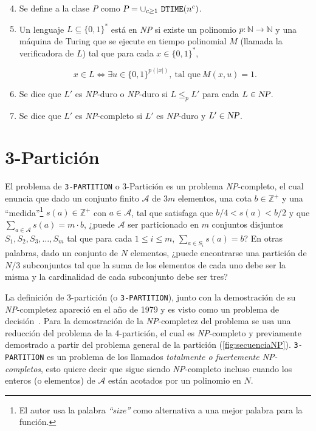 \begin{enumerate}
  \setcounter{enumi}{3}

\item Se define a la clase \textsl{P} como
  $\textsl{P} = \cup_{c \geq 1} ~ \texttt{DTIME}(n^{c})$.

\item Un lenguaje $L \subseteq \{0, 1\}^{*}$ está en \textsl{NP} si existe un
  polinomio $p: \mathbb{N} \longrightarrow \mathbb{N}$ y una máquina de Turing
  que se ejecute en tiempo polinomial $M$ (llamada la verificadora de $L$) tal
  que para cada $x \in \{0,1\}^{*}$,

  \begin{displaymath}
    x \in L \Leftrightarrow \exists u \in \{0,1\}^{p(|x|)},~
    \textrm{tal que} ~ M(x,u) = 1.
  \end{displaymath}

\item Se dice que $L'$ es \textsl{NP}-duro o \textsl{NP}-duro si
  $L \leq_{p} L'$ para cada $L \in \textsl{NP} $.

\item Se dice que $L'$ es \textsl{NP}-completo si $L'$ es \textsl{NP}-duro y
  $L' \in \textsl{NP}$.

\end{enumerate}




\section{3-Partición}
\label{sec:3-particion}

El problema de \texttt{3-PARTITION} o 3-Partición es un problema \textsl{NP}-completo,
el cual enuncia que dado un conjunto finito $\mathcal{A}$ de $3m$ elementos,
una cota $b \in \mathds{Z}^{+}$ y una ``medida''\footnote{El autor usa la
palabra \textit{``size''} como alternativa a una mejor palabra para la función.}
$s(a) \in \mathds{Z}^{+}$ con $a \in \mathcal{A}$, tal que
satisfaga que $b/4 < s(a) < b/2$ y que $\sum_{a \in \mathcal{A}} s(a) = m \cdot b$,
¿puede $\mathcal{A}$ ser particionado en $m$ conjuntos disjuntos $S_{1}, S_{2},
S_{3}, \ldots , S_{m}$ tal que para cada $1 \leq i \leq m $, $\sum_{a \in S_{i}}
s(a)=b$? En otras palabras, dado un conjunto de $N$ elementos,
¿puede encontrarse una partición de $N/3$ subconjuntos tal que la suma de los
elementos de cada uno debe ser la misma y la cardinalidad de cada subconjunto
debe ser tres?

La definición de 3-partición (o \texttt{3-PARTITION}), junto con la demostración
de su \mbox{\textsl{NP}-completez} apareció en el año de 1979 y es visto como
un problema de decisión~\cite{Garey:1990:CIG:574848}. Para la demostración de la
\textsl{NP}-completez del problema se usa una reducción del problema de la
4-partición, el cual es \textsl{NP}-completo y previamente demostrado a partir
del problema general de la partición
(\cref{fig:secuenciaNP}). \texttt{3-PARTITION} es un problema de los llamados
\textit{totalmente o fuertemente \textsl{NP}-completos}, esto quiere decir que
sigue siendo \textsl{NP}-completo incluso cuando los enteros (o elementos) de
$\mathcal{A}$ están acotados por un polinomio en $N$.

